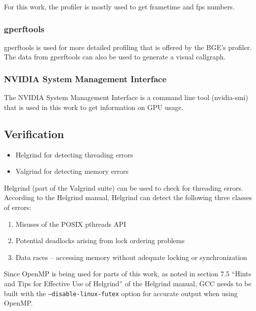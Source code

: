 For this work, the profiler is mostly used to get frametime and fps numbers.

\subsubsection{gperftools}
gperftools\cite{gperftools} is used for more detailed profiling that is offered by the BGE's profiler.
The data from gperftools can also be used to generate a visual callgraph.

\subsubsection{NVIDIA System Management Interface}
The NVIDIA System Management Interface is a command line tool (nvidia-smi) that is used in this work to get information on GPU usage.

\subsection{Verification}
\ifsummaries
\begin{itemize}
 \item Helgrind for detecting threading errors
 \item Valgrind for detecting memory errors
\end{itemize}
\fi

Helgrind (part of the Valgrind suite\cite{valgrind}) can be used to check for threading errors.
According to the Helgrind manual\cite{hgmanual}, Helgrind can detect the following three classes of errors:
\begin{enumerate}
 \item Misuses of the POSIX pthreads API
 \item Potential deadlocks arising from lock ordering problems
 \item Data races -- accessing memory without adequate locking or synchronization
\end{enumerate}

Since OpenMP is being used for parts of this work, as noted in section 7.5 ``Hints and Tips for Effective Use of Helgrind'' of the Helgrind manual\cite{hgmanual}, GCC needs to be built with the \texttt{--disable-linux-futex} option for accurate output when using OpenMP.

